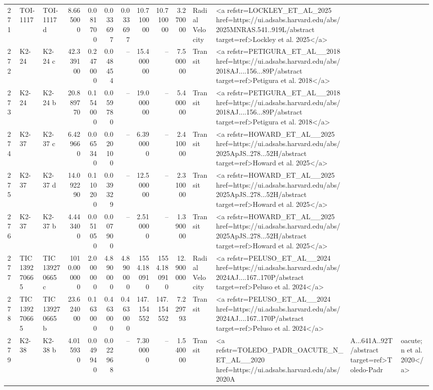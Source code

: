\begin{tabular}{lllrrrrrrrll}
271 & TOI-1117 & TOI-1117 d & 8.665000 & 0.081700 & 0.033697 & 0.033697 & 10.710000 & 10.710000 & 3.270000 & Radial Velocity & <a refstr=LOCKLEY_ET_AL_2025 href=https://ui.adsabs.harvard.edu/abs/2025MNRAS.541..919L/abstract target=ref>Lockley et al. 2025</a> \\
272 & K2-24 & K2-24 c & 42.339100 & 0.247000 & 0.048454 & -- & 15.400000 & -- & 7.500000 & Transit & <a refstr=PETIGURA_ET_AL__2018 href=https://ui.adsabs.harvard.edu/abs/2018AJ....156...89P/abstract target=ref>Petigura et al. 2018</a> \\
273 & K2-24 & K2-24 b & 20.889770 & 0.154000 & 0.059780 & -- & 19.000000 & -- & 5.400000 & Transit & <a refstr=PETIGURA_ET_AL__2018 href=https://ui.adsabs.harvard.edu/abs/2018AJ....156...89P/abstract target=ref>Petigura et al. 2018</a> \\
274 & K2-37 & K2-37 c & 6.429660 & 0.065340 & 0.020100 & -- & 6.390000 & -- & 2.410000 & Transit & <a refstr=HOWARD_ET_AL__2025 href=https://ui.adsabs.harvard.edu/abs/2025ApJS..278...52H/abstract target=ref>Howard et al. 2025</a> \\
275 & K2-37 & K2-37 d & 14.092290 & 0.110200 & 0.039329 & -- & 12.500000 & -- & 2.310000 & Transit & <a refstr=HOWARD_ET_AL__2025 href=https://ui.adsabs.harvard.edu/abs/2025ApJS..278...52H/abstract target=ref>Howard et al. 2025</a> \\
276 & K2-37 & K2-37 b & 4.443400 & 0.051050 & 0.007900 & -- & 2.510000 & -- & 1.390000 & Transit & <a refstr=HOWARD_ET_AL__2025 href=https://ui.adsabs.harvard.edu/abs/2025ApJS..278...52H/abstract target=ref>Howard et al. 2025</a> \\
277 & TIC 139270665 & TIC 139270665 c & 1010.000000 & 2.000000 & 4.890000 & 4.890000 & 1554.180910 & 1554.180910 & 12.900000 & Radial Velocity & <a refstr=PELUSO_ET_AL__2024 href=https://ui.adsabs.harvard.edu/abs/2024AJ....167..170P/abstract target=ref>Peluso et al. 2024</a> \\
278 & TIC 139270665 & TIC 139270665 b & 23.624000 & 0.163000 & 0.463000 & 0.463000 & 147.154552 & 147.154552 & 7.229793 & Transit & <a refstr=PELUSO_ET_AL__2024 href=https://ui.adsabs.harvard.edu/abs/2024AJ....167..170P/abstract target=ref>Peluso et al. 2024</a> \\
279 & K2-38 & K2-38 b & 4.015930 & 0.049940 & 0.022968 & -- & 7.300000 & -- & 1.540000 & Transit & <a refstr=TOLEDO_PADR_OACUTE_N_ET_AL__2020 href=https://ui.adsabs.harvard.edu/abs/2020A&A...641A..92T/abstract target=ref>Toledo-Padr&oacute;n et al. 2020</a> \\

\end{tabular}
